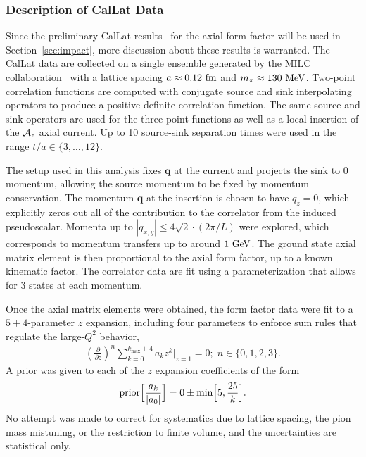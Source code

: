 \documentclass{ar-1col}
\begin{document}
\subsubsection{Description of CalLat Data}\label{sec:callatdata}

Since the preliminary CalLat results~\cite{Meyer:2021vfq} for the axial form factor will be used
 in Section~\ref{sec:impact}, more discussion about these results is warranted.
The CalLat data are collected on a single ensemble generated
 by the MILC collaboration~\cite{MILC:2012znn}
 with a lattice spacing $a\approx 0.12~{\rm fm}$ and $m_\pi\approx 130~{\rm MeV}$.
Two-point correlation functions are computed with conjugate
 source and sink interpolating operators
 to produce a positive-definite correlation function.
The same source and sink operators are used for the three-point functions
 as well as a local insertion of the ${\cal A}_z$ axial current.
Up to 10 source-sink separation times were used in the range $t/a\in\{3,\dots,12\}$.

The setup used in this analysis fixes $\bm{q}$ at the current
 and projects the sink to 0 momentum, allowing the source momentum to be
 fixed by momentum conservation.
The momentum $\bm{q}$ at the insertion is chosen to have $q_z=0$,
 which explicitly zeros out all of the contribution to the correlator
 from the induced pseudoscalar.
Momenta up to $|q_{x,y}| \leq 4\sqrt{2}\cdot (2\pi/L)$ were explored,
 which corresponds to momentum transfers up to around $1~{\rm GeV}$.
The ground state axial matrix element is then proportional to the axial form factor,
 up to a known kinematic factor.
The correlator data are fit using a parameterization that allows
 for 3 states at each momentum.

Once the axial matrix elements were obtained,
 the form factor data were fit to a $5+4$-parameter $z$ expansion,
 including four parameters to enforce sum rules that regulate the large-$Q^2$ behavior,
\begin{align}
 \left( \frac{\partial}{\partial z} \right)^n
 \sum_{k=0}^{k_{\text{max}}+4} a_k z^k \Big|_{z=1} = 0; \; n \in \{0,1,2,3\}.
\end{align}
A prior was given to each of the $z$ expansion coefficients of the form
\begin{align}
 {\rm prior}\Big[ \frac{a_k}{|a_0|} \Big] = 0 \pm {\rm min} \Big[ 5, \frac{25}{k} \Big].
\end{align}
No attempt was made to correct for systematics due to lattice spacing,
 the pion mass mistuning, or the restriction to finite volume,
 and the uncertainties are statistical only.
\end{document}
